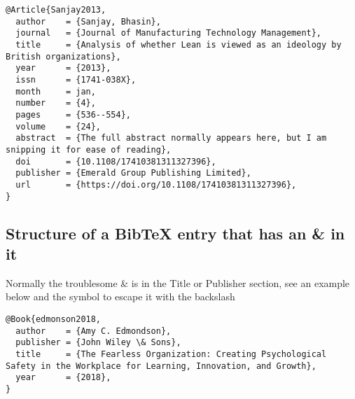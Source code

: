 \documentclass[12pt]{article}
\begin{document}
\begin{lstlisting}
@Article{Sanjay2013,
  author    = {Sanjay, Bhasin},
  journal   = {Journal of Manufacturing Technology Management},
  title     = {Analysis of whether Lean is viewed as an ideology by British organizations},
  year      = {2013},
  issn      = {1741-038X},
  month     = jan,
  number    = {4},
  pages     = {536--554},
  volume    = {24},
  abstract  = {The full abstract normally appears here, but I am snipping it for ease of reading},
  doi       = {10.1108/17410381311327396},
  publisher = {Emerald Group Publishing Limited},
  url       = {https://doi.org/10.1108/17410381311327396},
}

\end{lstlisting}

\subsection{Structure of a BibTeX entry that has an \& in it}

Normally the troublesome \& is in the Title or Publisher section, see an example below and the symbol to escape it with the backslash

\begin{lstlisting}
@Book{edmonson2018,
  author    = {Amy C. Edmondson},
  publisher = {John Wiley \& Sons},
  title     = {The Fearless Organization: Creating Psychological Safety in the Workplace for Learning, Innovation, and Growth},
  year      = {2018},
}

\end{lstlisting}







\end{document}
